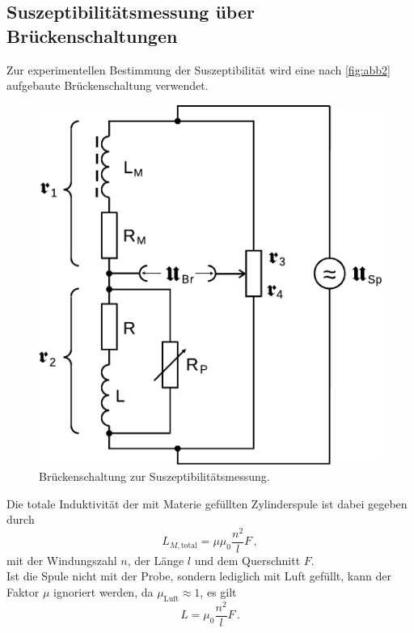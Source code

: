 \subsection{Suszeptibilitätsmessung über Brückenschaltungen}

Zur experimentellen Bestimmung der Suszeptibilität wird eine nach \autoref{fig:abb2} aufgebaute Brückenschaltung verwendet.

\begin{figure}
    \centering
    \includegraphics{figures/Abb_2.pdf}
    \caption{Brückenschaltung zur Suszeptibilitätsmessung\cite{ap07}.}
    \label{fig:abb2}
\end{figure}

Die totale Induktivität der mit Materie gefüllten Zylinderspule ist dabei gegeben durch
\begin{equation}
    L_{M,\text{total}} = \mu \mu_0 \dfrac{n^2}{l} F \,,
    \label{eq:induspu}
\end{equation}
mit der Windungszahl $n$, der Länge $l$ und dem Querschnitt $F$. \\

Ist die Spule nicht mit der Probe, sondern lediglich mit Luft gefüllt, kann der Faktor $\mu$ ignoriert werden, da $\mu_\text{Luft} \approx 1$, es gilt
\begin{equation}
    L = \mu_0 \dfrac{n^2}{l} F \,.
\end{equation} \\

